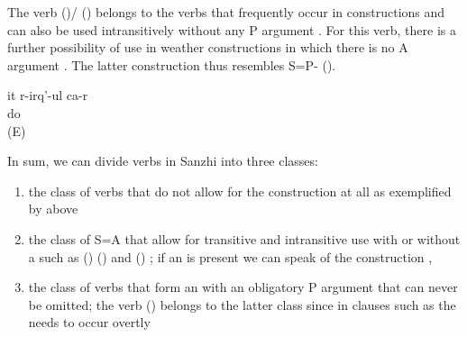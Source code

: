 The verb  ()\slash{} ()  belongs to the verbs that frequently occur in  constructions  and can also be used intransitively without any P argument . For this verb, there is a further possibility of use in weather constructions in which there is no A argument . The latter construction thus resembles S=P- ().
%
\begin{exe}
	\ex	\label{ex:She is busy}
	\gll	it	r-irq'-ul	ca-r\\
			do	\\
	\glt	{} (E)
\end{exe}

In sum, we can divide verbs in Sanzhi into three classes:
%
\begin{enumerate}
	\item	the class of verbs that do not allow for the  construction at all as exemplified by  above
	\item	the class of S=A  that allow for transitive and intransitive use with or without a  such as  () ()  and  () ; if an   is present we can speak of the  construction , 
	\item	the class of verbs that form an  with an obligatory P argument that can never be omitted; the verb  ()  belongs to the latter class since in clauses such as  the  needs to occur overtly
\end{enumerate}

